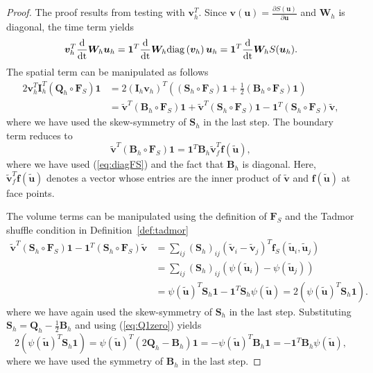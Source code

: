 \documentclass[review,onefignum,onetabnum,final]{siamart171218}
\renewcommand{\tilde}{\widetilde}
\newcommand{\td}[2]{\frac{{\rm d}#1}{{\rm d}{\rm #2}}}
\newcommand{\pd}[2]{\frac{\partial#1}{\partial#2}}
\newcommand{\LRp}[1]{\left( #1 \right)}
\newcommand{\diag}[1]{{\rm diag}\LRp{#1}}
\begin{document}
\begin{proof}
The proof results from testing with $\bm{v}_h^T$.  Since $\bm{v}(\bm{u}) = \pd{S(\bm{u})}{\bm{u}}$ and $\bm{W}_h$ is diagonal, the time term yields
\[
\bm{v}_h^T\td{}{t}\bm{W}_h\bm{u}_h = \bm{1}^T \td{}{t}\bm{W}_h\diag{\bm{v}_h}\bm{u}_h = \bm{1}^T\td{}{t}\bm{W}_h S(\bm{u}_h).
\]
The spatial term can be manipulated as follows
\begin{align*}
2\bm{v}_h^T \bm{I}_h^T\LRp{\bm{Q}_h \circ \bm{F}_S}\bm{1} &= 2\LRp{\bm{I}_h\bm{v}_h}^T \LRp{\LRp{\bm{S}_h \circ \bm{F}_S}\bm{1} + \frac{1}{2}\LRp{\bm{B}_h \circ \bm{F}_S}\bm{1}}\\
&= \tilde{\bm{v}}^T\LRp{\bm{B}_h \circ \bm{F}_S}\bm{1} + \tilde{\bm{v}}^T \LRp{\bm{S}_h \circ \bm{F}_S}\bm{1} - \bm{1}^T \LRp{\bm{S}_h \circ \bm{F}_S}\tilde{\bm{v}},
\end{align*}
where we have used the skew-symmetry of $\bm{S}_h$ in the last step.  The boundary term reduces to 
\[
\tilde{\bm{v}}^T\LRp{\bm{B}_h \circ \bm{F}_S}\bm{1} = \bm{1}^T\bm{B}_h\tilde{\bm{v}}_f^T\bm{f}\LRp{\tilde{\bm{u}}},
\]
where we have used (\ref{eq:diagFS}) and the fact that $\bm{B}_h$ is diagonal.  Here, $\tilde{\bm{v}}_f^T\bm{f}\LRp{\tilde{\bm{u}}}$ denotes a vector whose entries are the inner product of $\tilde{\bm{v}}$ and $\bm{f}\LRp{\tilde{\bm{u}}}$ at face points.  

The volume terms can be manipulated using the definition of $\bm{F}_S$ and the Tadmor shuffle condition in Definition~\ref{def:tadmor}
\begin{align*}
\tilde{\bm{v}}^T \LRp{\bm{S}_h \circ \bm{F}_S} \bm{1} - \bm{1}^T \LRp{\bm{S}_h \circ \bm{F}_S}\tilde{\bm{v}} 
&= \sum_{ij} \LRp{\bm{S}_h}_{ij} \LRp{\tilde{\bm{v}}_i - \tilde{\bm{v}}_j}^T\bm{f}_S\LRp{\tilde{\bm{u}}_i,\tilde{\bm{u}}_j}\\
&= \sum_{ij} \LRp{\bm{S}_h}_{ij} \LRp{\psi\LRp{\tilde{\bm{u}}_i} - \psi\LRp{\tilde{\bm{u}}_j}}\\
&= \psi\LRp{\tilde{\bm{u}}}^T \bm{S}_h \bm{1}- \bm{1}^T \bm{S}_h \psi\LRp{\tilde{\bm{u}}} = 2\LRp{ \psi\LRp{\tilde{\bm{u}}}^T\bm{S}_h\bm{1}}.
\end{align*}
where we have again used the skew-symmetry of $\bm{S}_h$ in the last step.  Substituting $\bm{S}_h = \bm{Q}_h - \frac{1}{2}\bm{B}_h$ and using (\ref{eq:Q1zero}) yields
\[
2\LRp{ \psi\LRp{\tilde{\bm{u}}}^T\bm{S}_h\bm{1}} = \psi\LRp{\tilde{\bm{u}}}^T\LRp{2\bm{Q}_h - \bm{B}_h} \bm{1} =-\psi\LRp{\tilde{\bm{u}}}^T\bm{B}_h \bm{1}  = -\bm{1}^T\bm{B}_h \psi\LRp{\tilde{\bm{u}}}, 
\]
where we have used the symmetry of $\bm{B}_h$ in the last step.
\end{proof}
\end{document}
